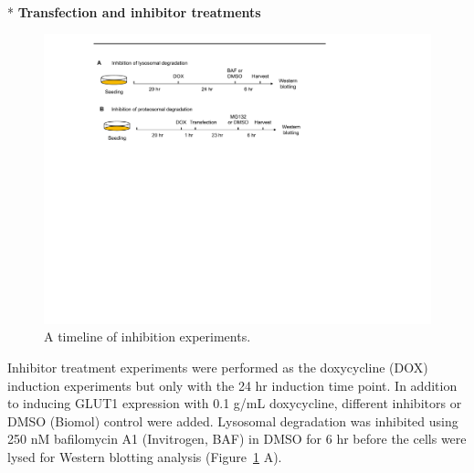 \\*
\bfseries{Transfection and inhibitor treatments}\\
\begin{figure}[h]
\centering
\includegraphics[scale=0.7]{Figures/treatment}
\caption{A timeline of inhibition experiments.}
\label{fig:inhibition}
\end{figure}
\normalfont Inhibitor treatment experiments were performed as the doxycycline (DOX) induction experiments but only with the 24 hr induction time point. In addition to inducing GLUT1 expression with 0.1 \textmu g/mL doxycycline, different inhibitors or DMSO (Biomol) control were added. Lysosomal degradation was inhibited using 250 nM bafilomycin A1 (Invitrogen, BAF) in DMSO for 6 hr before the cells were lysed for Western blotting analysis (Figure~\ref{fig:inhibition} A).

